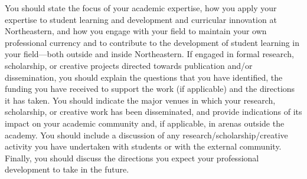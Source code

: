 You should state the focus of your academic expertise, how you apply your expertise to student learning and development and curricular innovation at Northeastern, and how you engage with your field to maintain your own professional currency and to contribute to the development of student learning in your field—both outside and inside Northeastern. 
If engaged in formal research, scholarship, or creative projects directed towards publication and/or dissemination, you should explain the questions that you have identified, the funding you have received to support the work (if applicable) and the directions it has taken. 
You should indicate the major venues in which your research, scholarship, or creative work has been disseminated, and provide indications of its impact on your academic community and, if applicable, in arenas outside the academy. 
You should include a discussion of any research/scholarship/creative activity you have undertaken with students or with the external community. 
Finally, you should discuss the directions you expect your professional development to take in the future.
